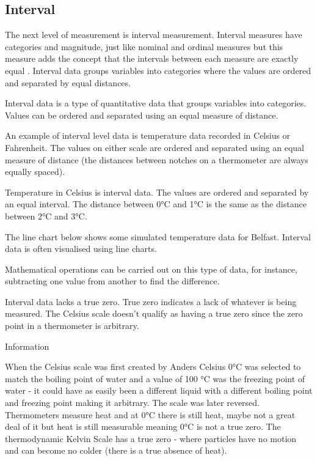 \documentclass[
]{book}
\begin{document}
\hypertarget{interval}{%
\subsection{Interval}\label{interval}}

The next level of measurement is interval measurement. Interval measures have categories and magnitude, just like nominal and ordinal measures but this measure adds the concept that the intervals between each measure are exactly equal \citep{mchugh2}. Interval data groups variables into categories where the values are ordered and separated by equal distances.

Interval data is a type of quantitative data that groups variables into categories. Values can be ordered and separated using an equal measure of distance.

An example of interval level data is temperature data recorded in Celsius or Fahrenheit. The values on either scale are ordered and separated using an equal measure of distance (the distances between notches on a thermometer are always equally spaced).

Temperature in Celsius is interval data. The values are ordered and separated by an equal interval. The distance between 0°C and 1°C is the same as the distance between 2°C and 3°C.

The line chart below shows some simulated temperature data for Belfast. Interval data is often visualised using line charts.

Mathematical operations can be carried out on this type of data, for instance, subtracting one value from another to find the difference.

Interval data lacks a true zero. True zero indicates a lack of whatever is being measured. The Celsius scale doesn't qualify as having a true zero since the zero point in a thermometer is arbitrary.

Information

When the Celsius scale was first created by Anders Celsius 0°C was selected to match the boiling point of water and a value of 100 °C was the freezing point of water - it could have as easily been a different liquid with a different boiling point and freezing point making it arbitrary. The scale was later reversed. Thermometers measure heat and at 0°C there is still heat, maybe not a great deal of it but heat is still measurable meaning 0°C is not a true zero. The thermodynamic Kelvin Scale has a true zero - where particles have no motion and can become no colder (there is a true absence of heat).
\end{document}
